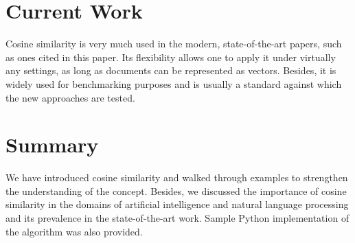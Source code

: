 \documentclass[11pt]{article}
\begin{document}

\section{Current Work}

Cosine similarity is very much used in the modern, state-of-the-art papers,
such as ones cited in this paper. Its flexibility allows one to apply it under
virtually any settings, as long as documents can be represented as vectors.
Besides, it is widely used for benchmarking purposes and is usually a standard
against which the new approaches are tested.


\section{Summary}

We have introduced cosine similarity and walked through examples to strengthen
the understanding of the concept. Besides, we discussed the importance of
cosine similarity in the domains of artificial intelligence and natural
language processing and its prevalence in the state-of-the-art work. Sample
Python implementation of the algorithm was also provided.


\newpage
\printbibliography[heading=bibintoc]

\end{document}
